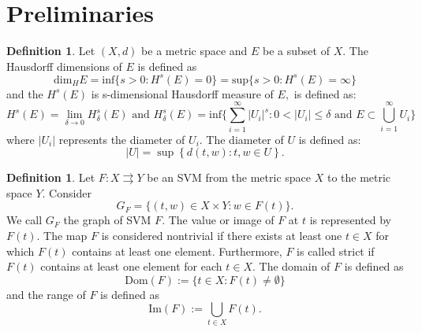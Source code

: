\documentclass[12pt,oneside,reqno]{amsart}
\theoremstyle{definition}
\newtheorem{definition}[theorem]{Definition}
\theoremstyle{remark}
\begin{document}



\section{Preliminaries}
\begin{definition} \cite{Fal}
    Let $(X,d)$ be a metric space and $E$ be a subset of $X$. The Hausdorff dimensions of $E$ is defined as 
    \[  \text{dim}_H E= \text{inf} \big\{s>0: H^s(E)=0\big\} = \text{sup}\big\{ s >0: H^s(E) =\infty\big\}\]
    and the $H^s(E)$ is s-dimensional Hausdorff measure of $E,$ is defined as:
    \[ H^s(E)=\lim_{\delta \rightarrow 0}H_\delta^s(E) \text{ and }  H_\delta^s(E) = \text{inf} \bigg\{ \sum_{i=1}^\infty\lvert U_i \rvert^s : 0< \lvert U_i\rvert \le \delta \text{ and } E\subset \bigcup_{i=1}^{\infty} U_i \bigg\}  \]
    where $\lvert U_i \rvert$ represents the diameter of $U_i$. The diameter of $U$ is defined as: \[\lvert U\rvert =\sup\left\{d(t,w): t,w \in U\right\}.\]
\end{definition}


 \begin{definition}\cite[Definition 1.3.1]{Aubin}
 Let $F:X\rightrightarrows Y$ be an SVM from the metric space $X$ to the metric space $Y$. Consider
 \begin{equation}\label{Gf1}
   G_F=\{(t,w) \in X \times Y: w \in F(t)\}.
 \end{equation}
 We call $G_F$  the graph of SVM $F$. The value or image of $F$ at $t$ is represented by $F(t)$. The map $F$ is considered nontrivial if there exists at least one $t \in X$ for which $F(t)$ contains at least one element. Furthermore, $F$ is called strict if $F(t)$ contains at least one element for each $t \in X.$ The domain of $F$ is defined as 
  \[\text{Dom}(F):=\{t \in X: F(t) \ne \emptyset\}\] 
 and the range of $F$ is defined as \[\text{Im}(F):= \underset{t \in X}{\bigcup}F(t).\]
 \end{definition}
 
\end{document}
